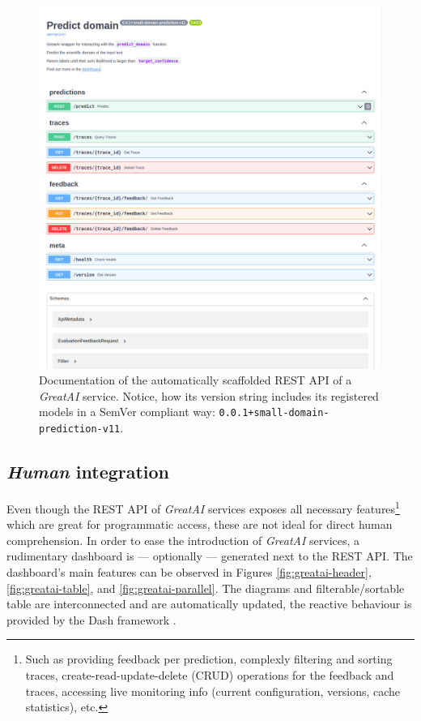 \begin{figure}
    \centering
    \includegraphics[width=0.85\linewidth]{figures/greatai-api.png}
    \captionsetup{width=.9\linewidth}
    \caption{Documentation of the automatically scaffolded REST API of a \textit{GreatAI} service. Notice, how its version string includes its registered models in a SemVer compliant way: \texttt{0.0.1+small-domain-prediction-v11}.}
    \label{fig:greatai-api}
\end{figure}

\subsection{\textit{Human} integration}

Even though the REST API of \textit{GreatAI} services exposes all necessary features\footnote{Such as providing feedback per prediction, complexly filtering and sorting traces, create-read-update-delete (CRUD) operations for the feedback and traces, accessing live monitoring info (current configuration, versions, cache statistics), etc.} which are great for programmatic access, these are not ideal for direct human comprehension. In order to ease the introduction of \textit{GreatAI} services, a rudimentary dashboard is --- optionally --- generated next to the REST API. The dashboard's main features can be observed in Figures \ref{fig:greatai-header}, \ref{fig:greatai-table}, and \ref{fig:greatai-parallel}. The diagrams and filterable/sortable table are interconnected and are automatically updated, the reactive behaviour is provided by the Dash framework \cite{shammamah_hossain-proc-scipy-2019}.

